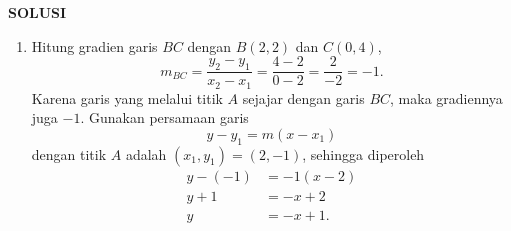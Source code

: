 \documentclass[11pt,openany,a4paper]{article}
\renewcommand{\headrulewidth}{0pt}
\begin{document}
\newpage
\fancyfoot{}
{\centering\textbf{SOLUSI}}
\renewcommand{\arraystretch}{1.5}
\renewcommand{\headrulewidth}{1pt}
\begin{enumerate}
    \item Hitung gradien garis $BC$ dengan $B(2,2)$ dan $C(0,4)$,
          \[
              m_{BC} = \frac{y_2 - y_1}{x_2 - x_1} = \frac{4 - 2}{0 - 2} = \frac{2}{-2} = -1.
          \]
          Karena garis yang melalui titik $A$ sejajar dengan garis $BC$, maka gradiennya juga $-1$. Gunakan persamaan garis
          \[
              y - y_1 = m(x - x_1)
          \]
          dengan titik $A$ adalah $(x_1,y_1) = (2,-1)$, sehingga diperoleh
          \begin{align*}
              y - (-1) & = -1(x - 2) \\
              y + 1    & = -x + 2    \\
              y        & = -x + 1.
          \end{align*}


\end{enumerate}
\end{document}
